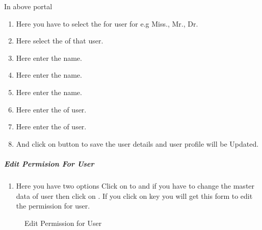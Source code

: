 \documentclass[a4paper,10pt,english]{report}
\begin{document}
In above portal
\begin{enumerate}
\def\theenumi{\arabic{enumi}}
\def\labelenumi{\theenumi .}
\makeatletter\def\p@enumii{\p@enumi \theenumi .}\makeatother
\item {} 
Here you have to select the   for user for e.g Miss., Mr., Dr.

\item {} 
Here select the  of that user.

\item {} 
Here enter the  name.

\item {} 
Here enter the  name.

\item {} 
Here enter the  name.

\item {} 
Here enter the  of user.

\item {} 
Here enter the  of user.

\item {} 
And click on  button to save the user details and user profile will be Updated.

\end{enumerate}


\subparagraph{Edit Permision For User}
\label{\detokenize{mng users:edit-permision-for-user}}\begin{enumerate}
\def\theenumi{\alph{enumi}}
\def\labelenumi{\theenumi .}
\makeatletter\def\p@enumii{\p@enumi \theenumi .}\makeatother
\setcounter{enumi}{4}
\item {} 
Here you have two options Click on  to   and if you have to change the master data of user then click on  . If you click on key you will get this form to edit the permission for user.

\end{enumerate}

\begin{figure}[htbp]
\centering
\capstart

\noindent{}
\caption{Edit Permission for User}\label{\detokenize{mng users:id9}}\label{\detokenize{mng users:id4}}\end{figure}
\end{document}
